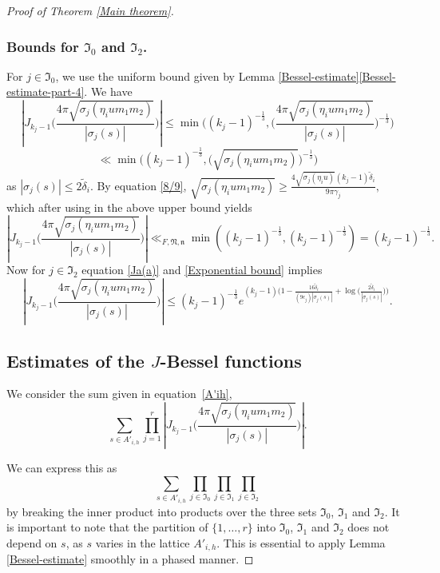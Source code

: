 \documentclass[reqno]{amsart}
\theoremstyle{plain}
\theoremstyle{definition}
\theoremstyle{remark}
\def\log{\operatorname{log}}
\begin{document}
\begin{proof}[Proof of Theorem \ref{Main theorem}]
\subsubsection{Bounds for $\mathfrak{I}_0$ and $\mathfrak{I}_2$.}\label{subsec:bounds-I0-I2}

For $j \in \mathfrak{I}_0$, we use the uniform bound given by Lemma \ref{Bessel-estimate}\ref{Bessel-estimate-part-4}.
We have  $$\left| J_{k_{j}-1} \Big(  \frac{4 \pi\sqrt{\sigma_{j} (\eta_i u m_1m_2 )}}{|\sigma_{j}(s)|}\Big)\right| \leq \min \Bigg((k_{j}-1)^{-\frac{1}{3}},\Big(  \frac{4 \pi\sqrt{\sigma_{j} (\eta_i u m_1m_2 )}}{|\sigma_{j}(s)|}\Big)^{-\frac{1}{3}}\Bigg)$$
$$\ll  \min \Big((k_{j}-1)^{-\frac{1}{3}},\Big(  \sqrt{\sigma_{j} (\eta_i u m_1m_2 )}\Big)^{-\frac{1}{3}}\Big)$$
as $|\sigma_{j}(s)| \leq 2 \tilde{\delta}_i.$
By equation \eqref{8/9},  $\sqrt{\sigma_{j} (\eta_i u m_1m_2 )}\geq \frac{4\sqrt{\sigma_{j} (\eta_i u )} (k_{j}-1)\tilde{\delta}_i}{9\pi\gamma_{j}},$ which after using in the above upper bound yields  
\begin{equation}\label{bound for l}
  \left| J_{k_{j}-1} \Big(  \frac{4 \pi\sqrt{\sigma_{j} (\eta_i u m_1m_2 )}}{|\sigma_{j}(s)|}\Big)\right| \ll_{F,\mathfrak{N},\mathfrak{n}} \min\left(  (k_{j}-1)^{-\frac{1}{3}}, (k_{j}-1)^{-\frac{1}{3}}  \right ) =(k_{j}-1)^{-\frac{1}{3}}.
\end{equation}
Now for $j \in \mathfrak{I}_2$  equation \eqref{Ja(a)} and \eqref{Exponential bound} implies 
\begin{equation}\label{bound for g}
\left| J_{k_{j}-1} \Big(  \frac{4 \pi\sqrt{\sigma_{j} (\eta_i u m_1m_2 )}}{|\sigma_{j}(s)|}\Big)\right|
\leq (k_{j}-1)^{-\frac{1}{3}}e^{(k_{j}-1)\Bigg(1-\frac{16 \tilde{\delta}_i}{(9\epsilon_{j})|\sigma_{j}(s )|}+\log\Big(\frac{2\tilde{\delta}_i}{|\sigma_{j} (s )|}\Big)\Bigg)}.
\end{equation}

\subsection{Estimates of the $J$-Bessel functions}\label{sec 3}

 
 We consider the sum  given in  equation~\eqref{A'ih},   
 $$
 \sum_{s\in A'_{i,h} }    \prod_{j=1}^r \left| J_{k_j-1} \Big(  \frac{4 \pi\sqrt{\sigma_j (\eta_i u m_1m_2 )}}{|\sigma_j(s)|}\Big)\right|.
 $$ 


We can express this as 
$$
\sum_{s\in A'_{i,h} }    \prod_{j\in \mathfrak{I}_0} \prod_{j\in \mathfrak{I}_1} \prod_{j\in \mathfrak{I}_2} 
$$
by breaking the inner product into products over the three sets $\mathfrak{I}_0$, $\mathfrak{I}_1$ and $\mathfrak{I}_2$.
It is important to note that the partition of $\{1, \dots, r\}$ into $\mathfrak{I}_0$, $\mathfrak{I}_1$ and $\mathfrak{I}_2$ does not depend on $s$, as $s$ varies in the lattice $A'_{i,h}$. This is essential to apply Lemma \ref{Bessel-estimate} smoothly in a phased manner. 


\end{proof}
\end{document}
